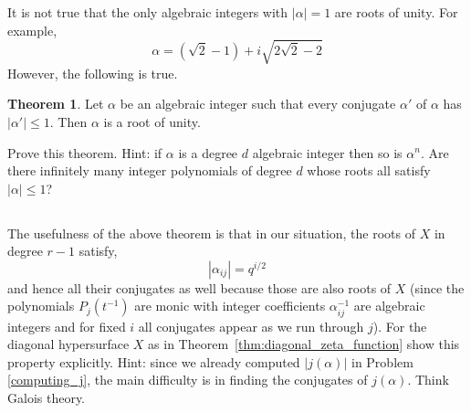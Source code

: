 \documentclass[12pt]{article}
\theoremstyle{remark}
\theoremstyle{definition}
\newtheorem{theorem}{Theorem}[subsection]
\begin{document}
It is not true that the only algebraic integers with $|\alpha| = 1$ are roots of unity. For example,
\[ \alpha = (\sqrt{2} - 1) + i \sqrt{2 \sqrt{2} - 2} \]
However, the following is true.

\begin{theorem}
Let $\alpha$ be an algebraic integer such that every conjugate $\alpha'$ of $\alpha$ has $|\alpha'| \le 1$. Then $\alpha$ is a root of unity.
\end{theorem}

Prove this theorem. Hint: if $\alpha$ is a degree $d$ algebraic integer then so is $\alpha^n$. Are there infinitely many integer polynomials of degree $d$ whose roots all satisfy $|\alpha| \le 1$?

\subsection{}

The usefulness of the above theorem is that in our situation, the roots of $X$ in degree $r-1$ satisfy,
\[ |\alpha_{ij}| = q^{i/2} \]
and hence all their conjugates as well because those are also roots of $X$ (since the polynomials $P_j(t^{-1})$ are monic with integer coefficients $\alpha_{ij}^{-1}$ are algebraic integers and for fixed $i$ all conjugates appear as we run through $j$). For the diagonal hypersurface $X$ as in Theorem~\ref{thm:diagonal_zeta_function} show this property explicitly. Hint: since we already computed $|j(\alpha)|$ in Problem \ref{computing_j}, the main difficulty is in finding the conjugates of $j(\alpha)$. Think Galois theory. 

\subsection{}

\newcommand{\iO}{\mathcal{O}}
\newcommand{\p}{\mathfrak{p}}
\end{document}
